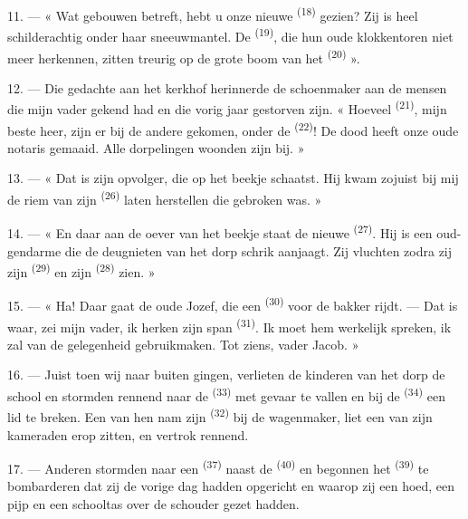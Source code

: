11. --- « Wat gebouwen betreft, hebt u onze nieuwe  \textsuperscript{(18)}
gezien? Zij is heel schilderachtig onder haar sneeuwmantel. De 
\textsuperscript{(19)}, die hun oude klokkentoren niet meer herkennen, zitten treurig op de
grote boom van het
 \textsuperscript{(20)} ».

12. --- Die gedachte aan het kerkhof herinnerde de schoenmaker aan de mensen die mijn vader
gekend had en die vorig jaar gestorven zijn. « Hoeveel  \textsuperscript{(21)},
mijn beste heer, zijn er bij de andere gekomen, onder de
 \textsuperscript{(22)}! De dood heeft onze oude notaris gemaaid.
Alle dorpelingen woonden zijn  bij. »

13. --- « Dat is zijn opvolger, die op het beekje schaatst. Hij kwam zojuist bij mij de riem
van zijn  \textsuperscript{(26)} laten herstellen die gebroken was. »

14. --- « En daar aan de oever van het beekje staat de nieuwe
 \textsuperscript{(27)}. Hij is een oud-gendarme die de
deugnieten van het dorp schrik aanjaagt. Zij vluchten zodra zij zijn
 \textsuperscript{(29)} en zijn 
\textsuperscript{(28)} zien. »

15. --- « Ha! Daar gaat de oude Jozef, die een 
\textsuperscript{(30)} voor de bakker rijdt. --- Dat is waar, zei mijn vader, ik herken zijn
span  \textsuperscript{(31)}. Ik moet hem werkelijk spreken, ik zal van de
gelegenheid gebruikmaken. Tot ziens, vader Jacob. »

16. --- Juist toen wij naar buiten gingen, verlieten de kinderen van het dorp de school en
stormden rennend naar de  \textsuperscript{(33)} met gevaar te vallen en bij
de  \textsuperscript{(34)} een lid te breken. Een van hen nam zijn 
\textsuperscript{(32)} bij de wagenmaker, liet een van zijn kameraden erop zitten, en vertrok
rennend.

17. --- Anderen stormden naar een  \textsuperscript{(37)} naast de
 \textsuperscript{(40)} en begonnen het
 \textsuperscript{(39)} te bombarderen dat zij de vorige dag
hadden opgericht en waarop zij een hoed, een pijp en een schooltas over de schouder gezet
hadden.

